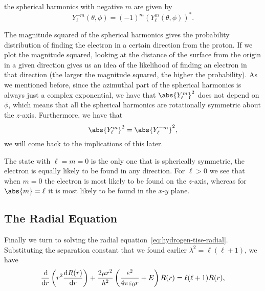 \documentclass[../quantum_mechanics.tex]{subfiles}
\begin{document}
            the spherical harmonics with negative $m$ are given by
            \begin{equation}
                Y_\ell^{-m}(\theta,\phi)=(-1)^m (Y_\ell^m(\theta,\phi))^\ast.
            \end{equation}

            The magnitude squared of the spherical harmonics gives the probability distribution of finding the electron in a certain direction from the proton.
            If we plot the magnitude squared, looking at the distance of the surface from the origin in a given direction gives us an idea of the likelihood of finding an electron in that direction (the larger the magnitude squared, the higher the probability).
            As we mentioned before, since the azimuthal part of the spherical harmonics is always just a complex exponential, we have that $\abs{Y_\ell^m}^2$ does not depend on $\phi$, which means that all the spherical harmonics are rotationally symmetric about the $z$-axis.
            Furthermore, we have that
            \begin{equation}
                \abs{Y_\ell^m}^2=\abs{Y_\ell^{-m}}^2,
            \end{equation}
            we will come back to the implications of this later.

            The state with $\ell=m=0$ is the only one that is spherically symmetric, the electron is equally likely to be found in any direction.
            For $\ell>0$ we see that when $m=0$ the electron is most likely to be found on the $z$-axis, whereas for $\abs{m}=\ell$ it is most likely to be found in the $x$-$y$ plane.

        \subsection{The Radial Equation}\label{sec:solving-the-hydrogen-atom:subsec:the-radial-equation}
            Finally we turn to solving the radial equation~\ref{eq:hydrogen-tise-radial}.
            Substituting the separation constant that we found earlier $\lambda^2=\ell(\ell+1)$, we have
            \begin{equation}\label{eq:hydrogen-tise-radial-ell}
                \dv{}{r}\left(r^2\dv{R(r)}{r}\right)+\frac{2\mu r^2}{\hbar^2}\left(\frac{e^2}{4\pi\varepsilon_0 r}+E\right)R(r)=\ell(\ell+1)R(r),
            \end{equation}
\end{document}

